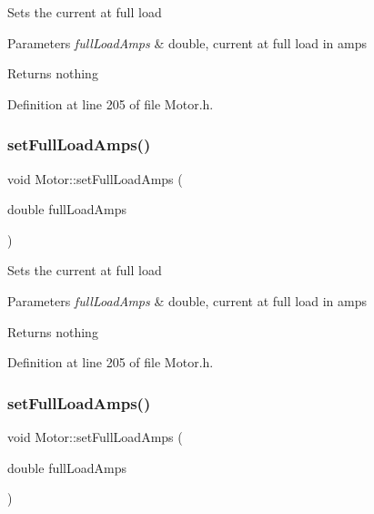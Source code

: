 Sets the current at full load


\begin{DoxyParams}{Parameters}
{\em full\+Load\+Amps} & double, current at full load in amps\\
\hline
\end{DoxyParams}
\begin{DoxyReturn}{Returns}
nothing 
\end{DoxyReturn}


Definition at line 205 of file Motor.\+h.

\mbox{\label{class_motor_a4bc8bf85c7749a0b7ff279d7eef20a2e}} 
\subsubsection{\texorpdfstring{set\+Full\+Load\+Amps()}{setFullLoadAmps()}\hspace{0.1cm}{\footnotesize\ttfamily [2/3]}}
{\footnotesize\ttfamily void Motor\+::set\+Full\+Load\+Amps (\begin{DoxyParamCaption}\item[{double}]{full\+Load\+Amps }\end{DoxyParamCaption})\hspace{0.3cm}{\ttfamily [inline]}}

Sets the current at full load


\begin{DoxyParams}{Parameters}
{\em full\+Load\+Amps} & double, current at full load in amps\\
\hline
\end{DoxyParams}
\begin{DoxyReturn}{Returns}
nothing 
\end{DoxyReturn}


Definition at line 205 of file Motor.\+h.

\mbox{\label{class_motor_a4bc8bf85c7749a0b7ff279d7eef20a2e}} 
\subsubsection{\texorpdfstring{set\+Full\+Load\+Amps()}{setFullLoadAmps()}\hspace{0.1cm}{\footnotesize\ttfamily [3/3]}}
{\footnotesize\ttfamily void Motor\+::set\+Full\+Load\+Amps (\begin{DoxyParamCaption}\item[{double}]{full\+Load\+Amps }\end{DoxyParamCaption})\hspace{0.3cm}{\ttfamily [inline]}}

